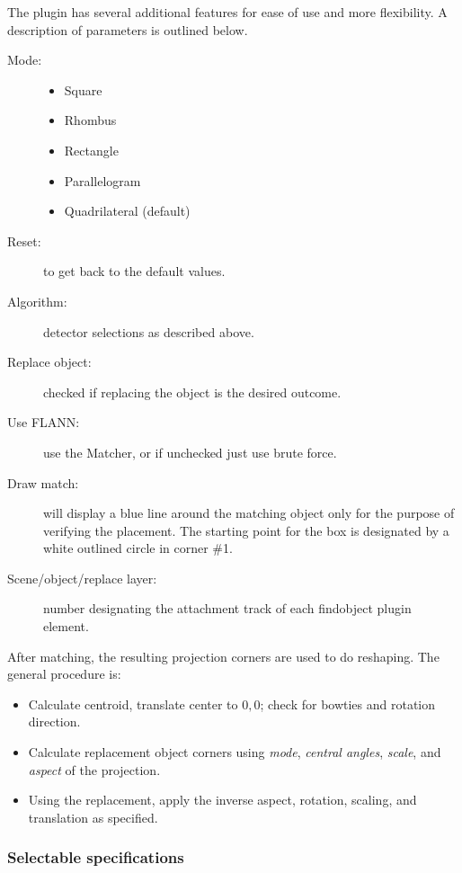 The \CGG{} plugin has several additional features for ease of use and more flexibility. A description of parameters is outlined below.

\begin{description}
    \item[Mode:]
    \begin{itemize}[noitemsep]
        \item Square
        \item Rhombus
        \item Rectangle
        \item Parallelogram
        \item Quadrilateral (default)
    \end{itemize}
    \item[Reset:] to get back to the default values.
    \item[Algorithm:] detector selections as described above.
    \item[Replace object:] checked if replacing the object is the desired outcome.
    \item[Use FLANN:] use the Matcher, or if unchecked just use brute force.
    \item[Draw match:] will display a blue line around the matching object only for the purpose of verifying the placement. The starting point for the box is designated by a white outlined circle in corner \#1.
    \item[Scene/object/replace layer:] number designating the attachment track of each findobject plugin element.
\end{description}

After matching, the resulting projection corners are used to do reshaping. The general procedure is:

\begin{itemize}[noitemsep]
    \item Calculate centroid, translate center to $0,0$; check for bowties and rotation direction.
    \item Calculate replacement object corners using \textit{mode}, \textit{central angles}, \textit{scale}, and \textit{aspect} of the projection.
    \item Using the replacement, apply the inverse aspect, rotation, scaling, and translation as specified.
\end{itemize}

\subsubsection*{Selectable specifications}%
\label{ssub:selectable_specifications}

